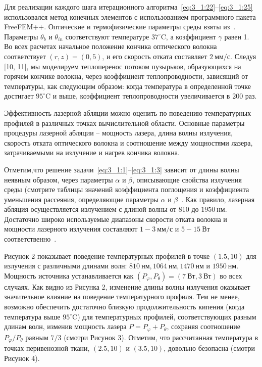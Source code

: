 Для реализации каждого шага итерационного
алгоритма~\eqref{eq:3_1:22}--\eqref{eq:3_1:25}
использовался метод конечных элементов с использованием
программного пакета FreeFEM++\cite{Hecht2012}.
Оптические и термофизические параметры среды
взяты из~\cite{Opticalthermal_vanRuijven2014}.
Параметры $\theta_{b}$ и $\theta_{i n}$ соответствуют
температуре $37^{\circ} \mathrm{C}$, а коэффициент $\gamma$ равен 1.
Во всех расчетах начальное положение кончика оптического волокна
соответствует $(r, z)=(0,5)$, и его скорость отката составляет
$2 \mathrm{~мм} / \mathrm{с}$.
Следуя [10, 11], мы моделируем теплоперенос потоком пузырьков,
образующихся на горячем кончике волокна, через коэффициент теплопроводности,
зависящий от температуры, как следующим образом: когда температура
в определенной точке достигает $95^{\circ} \mathrm{C}$ и выше,
коэффициент теплопроводности увеличивается в 200 раз.

Эффективность лазерной абляции можно оценить по поведению
температурных профилей в различных точках вычислительной области.
Основные параметры процедуры лазерной абляции -- мощность лазера,
длина волны излучения, скорость отката оптического волокна и
соотношение между мощностями лазера, затрачиваемыми на
излучение и нагрев кончика волокна.

Отметим,что решение задачи~\eqref{eq:3_1:1}--\eqref{eq:3_1:3} зависит от длины
волны неявным образом, через параметры $\alpha$ и $\beta$,
описывающие свойства излучения среды (смотрите таблицы значений коэффициента
поглощения и коэффициента уменьшения рассеяния, определяющие параметры
$\alpha$ и $\beta$~\cite{Opticalthermal_vanRuijven2014, Some_Poluektova2014}.
Как правило, лазерная абляция осуществляется излучением с длиной волны
от 810 до $1950 \mathrm{~нм}$.
Достаточно широко используемые диапазоны скорости отката волокна и мощности
лазерного излучения составляют $1-3 \mathrm{~мм} / \mathrm{с}$
и $5-15 \mathrm{~Вт}$
соответственно~\cite{
    Mathematical_Mordon2006,
    Opticalthermal_vanRuijven2014,
    Some_Poluektova2014
}.

Рисунок 2 показывает поведение температурных профилей в точке $(1.5,10)$ для
излучения с различными длинами волн: $810 \mathrm{~нм}, 1064 \mathrm{~нм},
1470 \mathrm{~нм}$ и $1950 \mathrm{~нм}$.
Мощность источника устанавливается как $\left(P_{\varphi}, P_{\theta}\right)
=(7 \mathrm{~Вт}, 3 \mathrm{~Вт})$ во всех случаях.
Как видно из Рисунка 2, изменение длины волны излучения оказывает
значительное влияние на поведение температурного профиля.
Тем не менее, возможно обеспечить достаточно близкую продолжительность
кипения (когда температура выше $95^{\circ} \mathrm{C}$) для температурных
профилей, соответствующих разным длинам волн, изменив мощность
лазера $P=P_{\varphi}+P_{\theta}$, сохраняя соотношение
$P_{\varphi} / P_{\theta}$ равным $7 / 3$ (смотри Рисунок 3).
Отметим, что рассчитанная температура в точках перивенозной ткани,
$(2.5,10)$ и $(3.5,10)$, довольно безопасна (смотри Рисунок 4).

